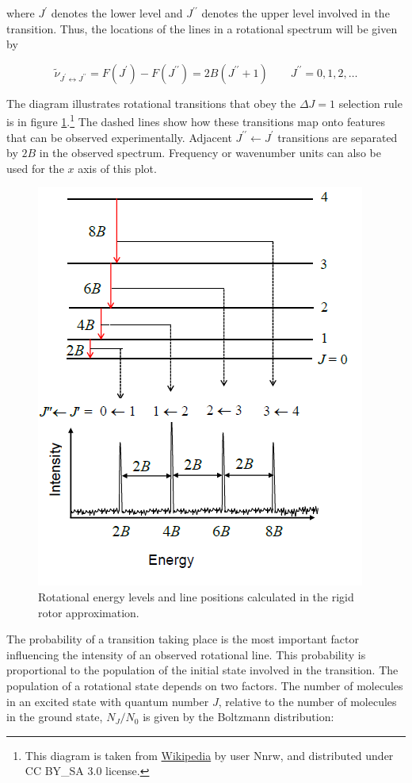 \documentclass[
  9pt,
]{extbook}
\theoremstyle{definition}
\theoremstyle{definition}
\theoremstyle{definition}
\theoremstyle{remark}
\begin{document}
where \(J^{{\prime }}\) denotes the lower level and \(J^{{\prime \prime }}\) denotes the upper level involved in the transition. Thus, the locations of the lines in a rotational spectrum will be given by

\begin{equation}
{\tilde  \nu }_{{J^{{\prime }}\leftrightarrow J^{{\prime \prime }}}}=F\left(J^{{\prime }}\right)-F\left(J^{{\prime \prime }}\right)=2B\left(J^{{\prime \prime }}+1\right)\qquad J^{{\prime \prime }}=0,1,2,\ldots
\label{eq:rot5}
\end{equation}

The diagram illustrates rotational transitions that obey the \(\Delta J=1\) selection rule is in figure \ref{fig:Fig1c13}.\footnote{This diagram is taken from \href{https://en.wikipedia.org/wiki/Rotational_spectroscopy\#/media/File:Rotational_spectrum_example.png}{Wikipedia} by user Nnrw, and distributed under CC BY\_SA 3.0 license.} The dashed lines show how these transitions map onto features that can be observed experimentally. Adjacent \(J^{{\prime \prime}}{\leftarrow}J^{{\prime }}\) transitions are separated by \(2B\) in the observed spectrum. Frequency or wavenumber units can also be used for the \(x\) axis of this plot.

\begin{figure}

{\centering \includegraphics[width=0.5\linewidth]{./img/OEP_wiki5} 

}

\caption{Rotational energy levels and line positions calculated in the rigid rotor approximation.}\label{fig:Fig1c13}
\end{figure}

The probability of a transition taking place is the most important factor influencing the intensity of an observed rotational line. This probability is proportional to the population of the initial state involved in the transition. The population of a rotational state depends on two factors. The number of molecules in an excited state with quantum number \(J\), relative to the number of molecules in the ground state, \(N_J/N_0\) is given by the Boltzmann distribution:
\end{document}
